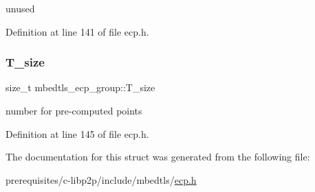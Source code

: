 unused 

Definition at line 141 of file ecp.\+h.

\mbox{\label{structmbedtls__ecp__group_a4b9a1bf79d2023dbc3807dc7e12059af}} 
\subsubsection{\texorpdfstring{T\+\_\+size}{T\_size}}
{\footnotesize\ttfamily size\+\_\+t mbedtls\+\_\+ecp\+\_\+group\+::\+T\+\_\+size}

number for pre-\/computed points 

Definition at line 145 of file ecp.\+h.



The documentation for this struct was generated from the following file\+:\begin{DoxyCompactItemize}
\item 
prerequisites/c-\/libp2p/include/mbedtls/\mbox{\hyperlink{ecp_8h}{ecp.\+h}}\end{DoxyCompactItemize}
